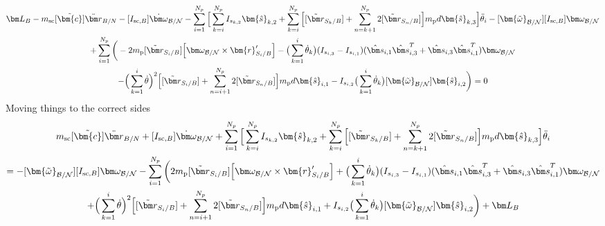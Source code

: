 \documentclass[paper]{aiaaNew}
\begin{document}
\begin{multline}
\bm L_B - m_{\text{sc}}[\tilde{\bm{c}}]\ddot{\bm r}_{B/N} -[I_{\text{sc},B}] \dot{\bm\omega}_{\cal B/N} - \sum\limits_{i=1}^{N_p} \Big[\sum^{N_p}_{k=i}I_{s_{k,2}} \bm{\hat{s}}_{k,2} + \sum\limits_{k=i}^{N_p}\Big[ [\tilde{{\bm r}}_{S_{k}/B}] + \sum\limits_{n=k+1}^{N_p}2[\tilde{{\bm r}}_{S_{n}/B}]\Big]m_{\text{p}} d \bm{\hat{s}}_{k,3} \Big] \ddot{\theta}_i -[\bm{\tilde{\omega}}_{\cal B/N}] [I_{\text{sc},B}] \bm\omega_{\cal B/N} \\
+ \sum\limits_{i=1}^{N_p}\bigg(- 2 m_{\text{p}} [\tilde{{\bm r}}_{S_{i}/B}] \Big[\bm\omega_{\cal B/N} \times \bm{r}'_{S_i/B}\Big] -\big(\sum^{i}_{k=1}\dot{\theta}_k\big)(I_{s_{i,3}}-I_{s_{i,1}})(\hat{\bm s}_{i,1}\hat{\bm s}_{i,3}^{T}+\hat{\bm s}_{i,3}\hat{\bm s}_{i,1}^{T}) \bm\omega_{\cal B/N} \\ 
 - \Big( \sum\limits_{k=1}^{i} \dot{\theta}\Big)^2 \Big[[\tilde{{\bm r}}_{S_{i}/B}] + \sum\limits_{n=i+1}^{N_p}2[\tilde{{\bm r}}_{S_{n}/B}]\Big] m_{\text{p}} d \bm{\hat{s}}_{i,1}
- I_{s_{i,2}} \big(\sum^{i}_{k=1}\dot{\theta}_k\big) [\bm{\tilde{\omega}}_{\cal B/N}] \bm{\hat{s}}_{i,2} \bigg) = 0
\end{multline}
Moving things to the correct sides
\begin{multline}
  m_{\text{sc}}[\tilde{\bm{c}}]\ddot{\bm r}_{B/N} + [I_{\text{sc},B}] \dot{\bm\omega}_{\cal B/N} + \sum\limits_{i=1}^{N_p} \Big[\sum^{N_p}_{k=i}I_{s_{k,2}} \bm{\hat{s}}_{k,2} + \sum\limits_{k=i}^{N_p}\Big[ [\tilde{{\bm r}}_{S_{k}/B}] + \sum\limits_{n=k+1}^{N_p}2[\tilde{{\bm r}}_{S_{n}/B}]\Big]m_{\text{p}} d \bm{\hat{s}}_{k,3} \Big] \ddot{\theta}_i \\
   = -[\bm{\tilde{\omega}}_{\cal B/N}] [I_{\text{sc},B}] \bm\omega_{\cal B/N} - \sum\limits_{i=1}^{N_p}\bigg(2 m_{\text{p}} [\tilde{{\bm r}}_{S_{i}/B}] \Big[\bm\omega_{\cal B/N} \times \bm{r}'_{S_i/B}\Big] + \big(\sum^{i}_{k=1}\dot{\theta}_k\big)(I_{s_{i,3}}-I_{s_{i,1}})(\hat{\bm s}_{i,1}\hat{\bm s}_{i,3}^{T}+\hat{\bm s}_{i,3}\hat{\bm s}_{i,1}^{T}) \bm\omega_{\cal B/N} \\ 
 + \Big( \sum\limits_{k=1}^{i} \dot{\theta}\Big)^2 \Big[[\tilde{{\bm r}}_{S_{i}/B}] + \sum\limits_{n=i+1}^{N_p}2[\tilde{{\bm r}}_{S_{n}/B}]\Big] m_{\text{p}} d \bm{\hat{s}}_{i,1}
+ I_{s_{i,2}} \big(\sum^{i}_{k=1}\dot{\theta}_k\big) [\bm{\tilde{\omega}}_{\cal B/N}] \bm{\hat{s}}_{i,2} \bigg) + \bm L_B
\end{multline}
\end{document}
